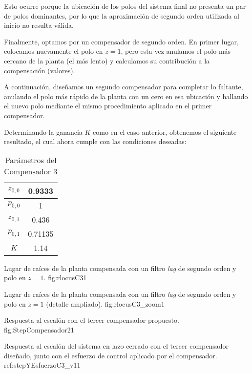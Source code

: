 Esto ocurre porque la ubicación de los polos del sistema final no presenta un par de polos dominantes, por lo que la aproximación de segundo orden utilizada al inicio no resulta válida.

Finalmente, optamos por un compensador de segundo orden. En primer lugar, colocamos nuevamente el polo en $z=1$, pero esta vez anulamos el polo más cercano de la planta (el más lento) y calculamos su contribución a la compensación (valores).

A continuación, diseñamos un segundo compensador para completar lo faltante, anulando el polo más rápido de la planta con un cero en esa ubicación y hallando el nuevo polo mediante el mismo procedimiento aplicado en el primer compensador.

Determinando la ganancia $K$ como en el caso anterior, obtenemos el siguiente resultado, el cual ahora cumple con las condiciones deseadas:
\begin{table}[H]
	\centering
	\caption{Parámetros del Compensador 3}
	\begin{tabular}{|c|c|}
		\hline
		$z_{0,0}$ & 0.9333 \\ \hline
		$p_{0,0}$ & 1 \\ \hline
		$z_{0,1}$ & 0.436 \\ \hline
		$p_{0,1}$ & 0.71135 \\ \hline
		$K$       & 1.14 \\ \hline
	\end{tabular}
\end{table}

{Lugar de raíces de la planta compensada con un filtro \emph{lag} de segundo orden y polo en $z=1$.}
{fig:rlocusC3}{1}

{Lugar de raíces de la planta compensada con un filtro \emph{lag} de segundo orden y polo en $z=1$ (detalle ampliado).}
{fig:rlocusC3_zoom}{1}

{Respuesta al escalón con el tercer compensador propuesto.}
{fig:StepCompensador2}{1}

{Respuesta al escal\'on del sistema en lazo cerrado con el tercer compensador dise\~nado, junto con el esfuerzo de control aplicado por el compensador.}
{ref:stepYEsfuerzoC3_v1}{1}

\balance
